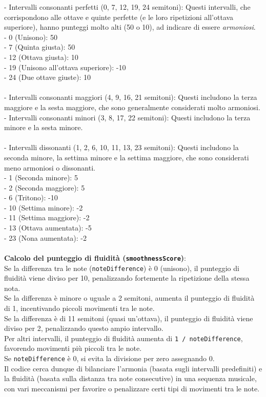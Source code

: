 \documentclass[a4paper,12pt]{report}
\begin{document}
- Intervalli consonanti perfetti (0, 7, 12, 19, 24 semitoni): Questi intervalli, che corrispondono alle ottave e quinte perfette (e le loro ripetizioni all'ottava superiore), hanno punteggi molto alti (50 o 10), ad indicare di essere \textit{armoniosi}. \\
    - 0 (Unisono): 50 \\
    - 7 (Quinta giusta): 50 \\
    - 12 (Ottava giusta): 10 \\
    - 19 (Unisono all'ottava superiore): -10 \\
    - 24 (Due ottave giuste): 10 \\
\\
- Intervalli consonanti maggiori (4, 9, 16, 21 semitoni): Questi includono la terza maggiore e la sesta maggiore, che sono generalmente considerati molto armoniosi. \\
- Intervalli consonanti minori (3, 8, 17, 22 semitoni): Questi includono la terza minore e la sesta minore. \\
\\
- Intervalli dissonanti (1, 2, 6, 10, 11, 13, 23 semitoni): Questi includono la seconda minore, la settima minore e la settima maggiore, che sono considerati meno armoniosi o dissonanti. \\
    - 1 (Seconda minore): 5 \\
    - 2 (Seconda maggiore): 5 \\
    - 6 (Tritono): -10 \\
    - 10 (Settima minore): -2 \\
    - 11 (Settima maggiore): -2 \\
    - 13 (Ottava aumentata): -5 \\
    - 23 (Nona aumentata): -2 \\
\\
\textbf{Calcolo del punteggio di fluidità (\texttt{smoothnessScore})}: \\
Se la differenza tra le note (\texttt{noteDifference}) è 0 (unisono), il punteggio di fluidità viene diviso per 10, penalizzando fortemente la ripetizione della stessa nota. \\
Se la differenza è minore o uguale a 2 semitoni, aumenta il punteggio di fluidità di 1, incentivando piccoli movimenti tra le note. \\
Se la differenza è di 11 semitoni (quasi un'ottava), il punteggio di fluidità viene diviso per 2, penalizzando questo ampio intervallo. \\
Per altri intervalli, il punteggio di fluidità aumenta di \texttt{1 / noteDifference}, favorendo movimenti più piccoli tra le note. \\
Se \texttt{noteDifference} è 0, si evita la divisione per zero assegnando 0. \\
Il codice cerca dunque di bilanciare l'armonia (basata sugli intervalli predefiniti) e la fluidità (basata sulla distanza tra note consecutive) in una sequenza musicale, con vari meccanismi per favorire o penalizzare certi tipi di movimenti tra le note. 
\end{document}
